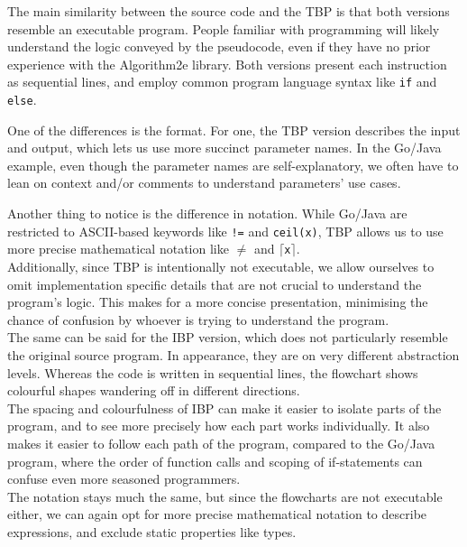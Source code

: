 The main similarity between the source code and the TBP is that both versions resemble an executable program. People familiar with programming will likely understand the logic conveyed by the pseudocode, even if they have no prior experience with the Algorithm2e library. Both versions present each instruction as sequential lines, and employ common program language syntax like \texttt{if} and \texttt{else}.

One of the differences is the format. For one, the TBP version describes the input and output, which lets us use more succinct parameter names. In the Go/Java example, even though the parameter names are self-explanatory, we often have to lean on context and/or comments to understand parameters' use cases. \\


Another thing to notice is the difference in notation. While Go/Java are restricted to ASCII-based keywords like \texttt{!=} and \texttt{ceil(x)}, TBP allows us to use more precise mathematical notation like \texttt{$\neq$} and \texttt{$\lceil$x$\rceil$}. \\

Additionally, since TBP is intentionally not executable, we allow ourselves to omit implementation specific details that are not crucial to understand the program's logic. This makes for a more concise presentation, minimising the chance of confusion by whoever is trying to understand the program. \\

The same can be said for the IBP version, which does not particularly resemble the original source program. In appearance, they are on very different abstraction levels. Whereas the code is written in sequential lines, the flowchart shows colourful shapes wandering off in different directions. \\

The spacing and colourfulness of IBP can make it easier to isolate parts of the program, and to see more precisely how each part works individually. It also makes it easier to follow each path of the program, compared to the Go/Java program, where the order of function calls and scoping of if-statements can confuse even more seasoned programmers. \\

The notation stays much the same, but since the flowcharts are not executable either, we can again opt for more precise mathematical notation to describe expressions, and exclude static properties like types.


